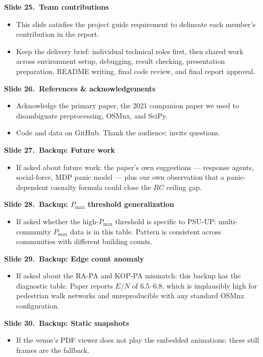 \documentclass[11pt]{article}
\newcommand{\slide}[2]{\vspace{0.6em}\noindent\textbf{Slide #1.\ #2}\par\nopagebreak\vspace{0.1em}}
\begin{document}
\slide{25}{Team contributions}
\begin{itemize}
\item This slide satisfies the project guide requirement to delineate each member's contribution in the report.
\item Keep the delivery brief: individual technical roles first, then shared work across environment setup, debugging, result checking, presentation preparation, README writing, final code review, and final report approval.
\end{itemize}

\slide{26}{References \& acknowledgements}
\begin{itemize}
\item Acknowledge the primary paper, the 2021 companion paper we used to disambiguate preprocessing, OSMnx, and SciPy.
\item Code and data on GitHub. Thank the audience; invite questions.
\end{itemize}

\slide{27}{Backup: Future work}
\begin{itemize}
\item If asked about future work: the paper's own suggestions --- response agents, social-force, MDP panic model --- plus our own observation that a panic-dependent casualty formula could close the $RC$ ceiling gap.
\end{itemize}

\slide{28}{Backup: $P_{\max}$ threshold generalization}
\begin{itemize}
\item If asked whether the high-$P_{\max}$ threshold is specific to PSU-UP: multi-community $P_{\max}$ data is in this table. Pattern is consistent across communities with different building counts.
\end{itemize}

\slide{29}{Backup: Edge count anomaly}
\begin{itemize}
\item If asked about the RA-PA and KOP-PA mismatch: this backup has the diagnostic table. Paper reports $E/N$ of 6.5--6.8, which is implausibly high for pedestrian walk networks and unreproducible with any standard OSMnx configuration.
\end{itemize}

\slide{30}{Backup: Static snapshots}
\begin{itemize}
\item If the venue's PDF viewer does not play the embedded animations: these still frames are the fallback.
\end{itemize}
\end{document}
